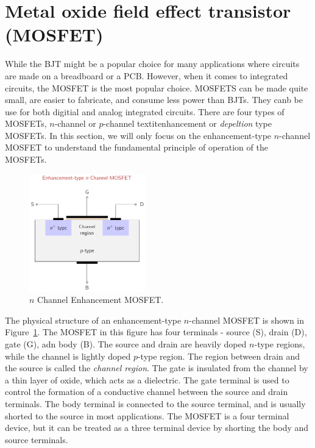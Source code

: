 \section{Metal oxide field effect transistor (MOSFET)}
While the BJT might be a popular choice for many applications where circuits are made on a breadboard or a PCB. However, when it comes to integrated circuits, the MOSFET is the most popular choice. MOSFETS can be made quite small, are easier to fabricate, and consume less power than BJTs. They canb be use for both digitial and analog integrated circuits. There are four types of MOSFETs, $n$-channel or $p$-channel textit{enhancement} or \textit{depeltion} type MOSFETs. In this section, we will only focus on the enhancement-type $n$-channel MOSFET to understand the fundamental principle of operation of the MOSFETs.

\begin{figure}[t]
    \centering
    \includegraphics[width=0.45\textwidth]{figure/ch03/fig03-mosfet-struct.pdf}
    \caption{$n$ Channel Enhancement MOSFET.}
    \label{fig:03-mosfet-struct}
\end{figure}

The physical structure of an enhancement-type $n$-channel MOSFET is shown in Figure~\ref{fig:03-mosfet-struct}. The MOSFET in this figure has four terminals - source (S), drain (D), gate (G), adn body (B). The source and drain are heavily doped $n$-type regions, while the channel is lightly doped $p$-type region. The region between drain and the source is called the \textit{channel region}. The gate is insulated from the channel by a thin layer of oxide, which acts as a dielectric. The gate terminal is used to control the formation of a conductive channel between the source and drain terminals. The body terminal is connected to the source terminal, and is usually shorted to the source in most applications. The MOSFET is a four terminal device, but it can be treated as a three terminal device by shorting the body and source terminals.


